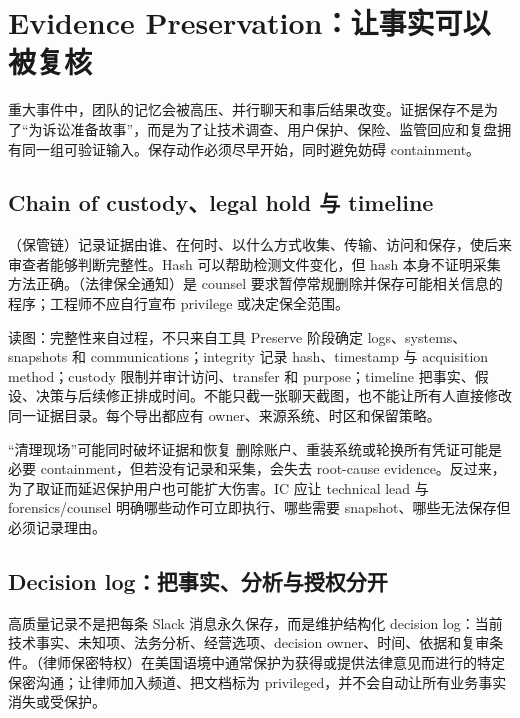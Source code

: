 \section{Evidence Preservation：让事实可以被复核}

重大事件中，团队的记忆会被高压、并行聊天和事后结果改变。证据保存不是为了“为诉讼准备故事”，而是为了让技术调查、用户保护、保险、监管回应和复盘拥有同一组可验证输入。保存动作必须尽早开始，同时避免妨碍 containment。

\subsection{Chain of custody、legal hold 与 timeline}

（保管链）记录证据由谁、在何时、以什么方式收集、传输、访问和保存，使后来审查者能够判断完整性。Hash 可以帮助检测文件变化，但 hash 本身不证明采集方法正确。（法律保全通知）是 counsel 要求暂停常规删除并保存可能相关信息的程序；工程师不应自行宣布 privilege 或决定保全范围。


\begin{knowledgebox}{读图：完整性来自过程，不只来自工具}
Preserve 阶段确定 logs、systems、snapshots 和 communications；integrity 记录 hash、timestamp 与 acquisition method；custody 限制并审计访问、transfer 和 purpose；timeline 把事实、假设、决策与后续修正排成时间。不能只截一张聊天截图，也不能让所有人直接修改同一证据目录。每个导出都应有 owner、来源系统、时区和保留策略。
\end{knowledgebox}

\begin{warningbox}{“清理现场”可能同时破坏证据和恢复}
删除账户、重装系统或轮换所有凭证可能是必要 containment，但若没有记录和采集，会失去 root-cause evidence。反过来，为了取证而延迟保护用户也可能扩大伤害。IC 应让 technical lead 与 forensics/counsel 明确哪些动作可立即执行、哪些需要 snapshot、哪些无法保存但必须记录理由。
\end{warningbox}

\subsection{Decision log：把事实、分析与授权分开}

高质量记录不是把每条 Slack 消息永久保存，而是维护结构化 decision log：当前技术事实、未知项、法务分析、经营选项、decision owner、时间、依据和复审条件。（律师保密特权）在美国语境中通常保护为获得或提供法律意见而进行的特定保密沟通；让律师加入频道、把文档标为 privileged，并不会自动让所有业务事实消失或受保护。

